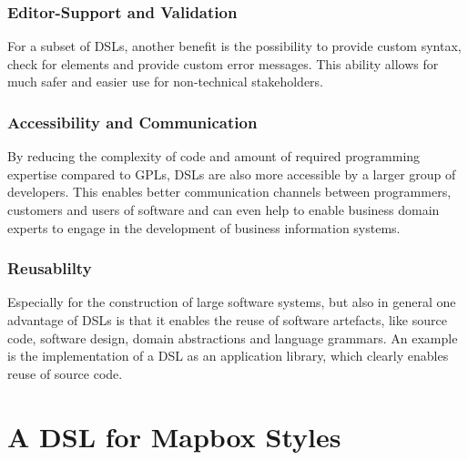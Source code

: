 \documentclass[conference]{IEEEtran}
\begin{document}
\subsubsection{Editor-Support and Validation}
For a subset of DSLs, another benefit is the possibility to provide custom syntax, check for elements and provide custom error messages. This ability allows for much safer and easier use for non-technical stakeholders.
\subsubsection{Accessibility and Communication}
By reducing the complexity of code and amount of required programming expertise compared to GPLs, DSLs are also more accessible by a larger group of developers. This enables better communication channels between programmers, customers and users of software and can even help to enable business domain experts to engage in the development of business information systems\cite{aram2015multilayered}.

\subsubsection{Reusablilty}
Especially for the construction of large software systems, but also in general one advantage of DSLs is that it enables the reuse of software artefacts, like source code, software design, domain abstractions and language grammars. An example is the implementation of a DSL as an application library, which clearly enables reuse of source code\cite{mernik2005and}.

\section{A DSL for Mapbox Styles}
\end{document}
